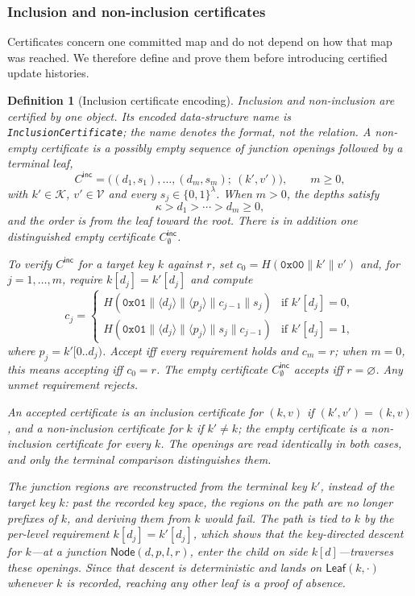 \documentclass[twocolumn]{article}
\newtheorem{definition}{Definition}
\begin{document}
\subsubsection{Inclusion and non-inclusion certificates}

Certificates concern one committed map and do not depend on how that map was reached. We therefore define and prove them before introducing certified update histories.

\begin{definition}[Inclusion certificate encoding]
\label{def:inclusion-cert}
Inclusion and non-inclusion are certified by one object. Its encoded data-structure name is \texttt{InclusionCertificate}; the name denotes the format, not the relation. A non-empty certificate is a possibly empty sequence of junction openings followed by a terminal leaf,
\[
  C^\mathsf{inc}=\big((d_1,s_1),\ldots,(d_m,s_m);\ (k',v')\big), \qquad m\geq 0,
\]
with $k'\in\mathcal{K}$, $v'\in\mathcal{V}$ and every $s_j\in\{0,1\}^{\lambda}$. When $m>0$, the depths satisfy
\[
  \kappa>d_1>\cdots>d_m\geq 0,
\]
and the order is from the leaf toward the root. There is in addition one distinguished empty certificate $C^\mathsf{inc}_\emptyset$.

To verify $C^\mathsf{inc}$ for a target key $k$ against $r$, set $c_0=H(\texttt{0x00}\|k'\|v')$ and, for $j=1,\ldots,m$, require $k[d_j]=k'[d_j]$ and compute
\[
c_j = \begin{cases}
H(\texttt{0x01}\|\langle d_j\rangle\|\langle p_j\rangle\|c_{j-1}\|s_j) & \text{if } k'[d_j] = 0,\\
H(\texttt{0x01}\|\langle d_j\rangle\|\langle p_j\rangle\|s_j\|c_{j-1}) & \text{if } k'[d_j] = 1,
\end{cases}
\]
where $p_j=k'[0..d_j)$. Accept iff every requirement holds and $c_m=r$; when $m=0$, this means accepting iff $c_0=r$. The empty certificate $C^\mathsf{inc}_\emptyset$ accepts iff $r=\varnothing$. Any unmet requirement rejects.

An accepted certificate is an \emph{inclusion certificate} for $(k,v)$ if $(k',v')=(k,v)$, and a \emph{non-inclusion certificate} for $k$ if $k'\neq k$; the empty certificate is a non-inclusion certificate for every $k$. The openings are read identically in both cases, and only the terminal comparison distinguishes them.

The junction regions are reconstructed from the \emph{terminal} key $k'$, instead of the target key $k$: past the recorded key space, the regions on the path are no longer prefixes of $k$, and deriving them from $k$ would fail. The path is tied to $k$ by the per-level requirement $k[d_j]=k'[d_j]$, which shows that the key-directed descent for $k$---at a junction $\mathsf{Node}(d,p,l,r)$, enter the child on side $k[d]$---traverses these openings. Since that descent is deterministic and lands on $\mathsf{Leaf}(k,\cdot)$ whenever $k$ is recorded, reaching any other leaf is a proof of absence.


\end{definition}
\end{document}
